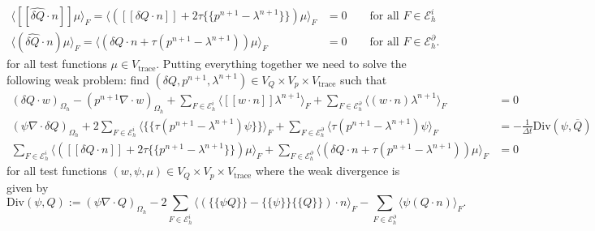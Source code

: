 \documentclass[11pt]{article}
\newcommand{\jump}[1]{[\![ #1]\!]}
\newcommand{\avg}[1]{\{\!\{#1\}\!\}}
\begin{document}
\begin{equation}
    \begin{aligned}
        \langle \jump{\widehat{\delta Q}\cdot n} \mu \rangle_F = \langle (\jump{\delta Q\cdot n} + 2\tau\avg{p^{n+1}-\lambda^{n+1}})\mu \rangle_F & =0 \qquad \text{for all $F\in\mathcal{E}_h^i$}         \\
        \langle (\widehat{\delta Q}\cdot n) \mu \rangle_F = \langle (\delta Q\cdot n + \tau(p^{n+1}-\lambda^{n+1}))\mu \rangle_F                  & = 0\qquad \text{for all $F\in\mathcal{E}_h^\partial$}.
    \end{aligned}
\end{equation}
for all test functions $\mu\in V_{\text{trace}}$.
Putting everything together we need to solve the following weak problem: find $(\delta Q,p^{n+1},\lambda^{n+1}) \in V_Q\times V_p\times V_{\text{trace}}$ such that
\begin{subequations}
    \begin{align}
        (\delta Q\cdot w)_{\Omega_h} - (p^{n+1} \nabla\cdot w)_{\Omega_h} +  \sum_{F\in\mathcal{E}_h^i} \langle \jump{w\cdot n}\lambda^{n+1}\rangle_{F}  +  \sum_{F\in\mathcal{E}_h^\partial} \langle (w\cdot n)\lambda^{n+1}\rangle_{F}             & = 0\label{eqn:mixed_poisson_velocity}                                                   \\
        (\psi \nabla\cdot \delta Q)_{\Omega_h} + 2 \sum_{F\in\mathcal{E}_h^i} \langle \avg{\tau (p^{n+1}-\lambda^{n+1})\psi}\rangle_{F}            + \sum_{F\in\mathcal{E}_h^\partial} \langle \tau (p^{n+1} - \lambda^{n+1})\psi\rangle_{F}         & = -\frac{1}{\Delta t}  \text{Div}(\psi,\overline{Q}) \label{eqn:mixed_poisson_pressure} \\
        \sum_{F\in\mathcal{E}_h^i} \langle \left(\jump{\delta Q\cdot n}+2\tau \avg{p^{n+1}-\lambda^{n+1}}\right)\mu \rangle_{F} + \sum_{F\in\mathcal{E}_h^\partial} \langle \left(\delta Q\cdot n+\tau (p^{n+1}-\lambda^{n+1})\right)\mu \rangle_{F} & = 0
        \label{eqn:mixed_poisson_uniqueness}
    \end{align}
\end{subequations}
for all test functions $(w,\psi,\mu) \in V_Q\times V_p\times V_{\text{trace}}$ where the weak divergence is given by
\begin{equation}
    \text{Div}(\psi,Q) := (\psi \nabla \cdot Q)_{\Omega_h}-2\sum_{F\in\mathcal{E}_h^i}\langle(\avg{\psi Q}-\avg{\psi}\avg{Q})\cdot n\rangle_F-\sum_{F\in\mathcal{E}_h^\partial}\langle\psi (Q\cdot n)\rangle_F.\label{eqn:weak_divergence}
\end{equation}
\end{document}
